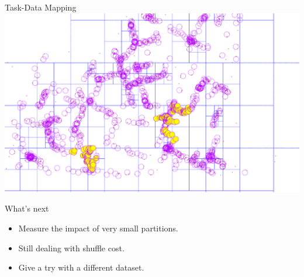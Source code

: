 \documentclass{beamer}
\begin{document}
\begin{frame}{Task-Data Mapping}
  \centering
  \includegraphics[width=\textwidth]{figures/BadPartitions}
\end{frame}

\begin{frame}{What's next}
    \begin{itemize}
        \item Measure the impact of very small partitions.
        \item Still dealing with shuffle cost.
        \item Give a try with a different dataset.
    \end{itemize}
\end{frame}
\end{document}
